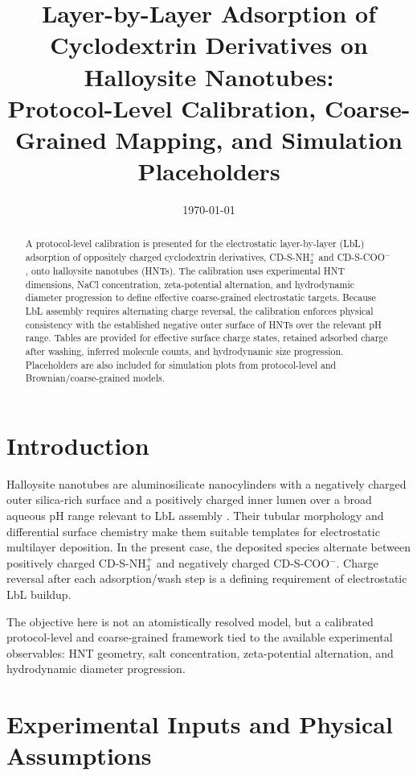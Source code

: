 \documentclass[11pt]{article}
\title{Layer-by-Layer Adsorption of Cyclodextrin Derivatives on Halloysite Nanotubes:\\
Protocol-Level Calibration, Coarse-Grained Mapping, and Simulation Placeholders}
\author{}
\date{\today}
\begin{document}
\maketitle

\begin{abstract}
A protocol-level calibration is presented for the electrostatic layer-by-layer (LbL) adsorption of oppositely charged cyclodextrin derivatives, CD-S-NH$_3^+$ and CD-S-COO$^-$, onto halloysite nanotubes (HNTs). The calibration uses experimental HNT dimensions, NaCl concentration, zeta-potential alternation, and hydrodynamic diameter progression to define effective coarse-grained electrostatic targets. Because LbL assembly requires alternating charge reversal, the calibration enforces physical consistency with the established negative outer surface of HNTs over the relevant pH range. Tables are provided for effective surface charge states, retained adsorbed charge after washing, inferred molecule counts, and hydrodynamic size progression. Placeholders are also included for simulation plots from protocol-level and Brownian/coarse-grained models.
\end{abstract}

\section{Introduction}
Halloysite nanotubes are aluminosilicate nanocylinders with a negatively charged outer silica-rich surface and a positively charged inner lumen over a broad aqueous pH range relevant to LbL assembly \citep{Veerabadran2009,Cavallaro2020}. Their tubular morphology and differential surface chemistry make them suitable templates for electrostatic multilayer deposition. In the present case, the deposited species alternate between positively charged CD-S-NH$_3^+$ and negatively charged CD-S-COO$^-$. Charge reversal after each adsorption/wash step is a defining requirement of electrostatic LbL buildup.

The objective here is not an atomistically resolved model, but a calibrated protocol-level and coarse-grained framework tied to the available experimental observables: HNT geometry, salt concentration, zeta-potential alternation, and hydrodynamic diameter progression.

\section{Experimental Inputs and Physical Assumptions}
\end{document}
